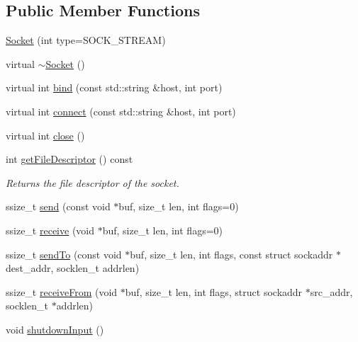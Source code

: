 \subsection*{Public Member Functions}
\begin{DoxyCompactItemize}
\item 
\hyperlink{classSocket_acd3cb39bc957be2f34c91b9e262e1cec}{Socket} (int type=S\-O\-C\-K\-\_\-\-S\-T\-R\-E\-A\-M)
\item 
virtual \hyperlink{classSocket_aeac4eb6379a543d38ed88977d3b6630a}{$\sim$\-Socket} ()
\item 
virtual int \hyperlink{classSocket_acdffcdd08c888132e95da022e0710b1d}{bind} (const std\-::string \&host, int port)
\item 
virtual int \hyperlink{classSocket_a772419bd74c4fe4987d190506a64ff87}{connect} (const std\-::string \&host, int port)
\item 
virtual int \hyperlink{classSocket_aef06605c6725958004116983f1a2051f}{close} ()
\item 
\hypertarget{classSocket_a6b4449d6b454bdb4a3a809976a3c2e41}{int \hyperlink{classSocket_a6b4449d6b454bdb4a3a809976a3c2e41}{get\-File\-Descriptor} () const }\label{classSocket_a6b4449d6b454bdb4a3a809976a3c2e41}

\begin{DoxyCompactList}\small\item\em Returns the file descriptor of the socket. \end{DoxyCompactList}\item 
ssize\-\_\-t \hyperlink{classSocket_a9275eacdb64056a53cf4b9cf54cd2f1a}{send} (const void $\ast$buf, size\-\_\-t len, int flags=0)
\item 
ssize\-\_\-t \hyperlink{classSocket_aa5e98b6f2c4e26fcf90d71c8386fc09d}{receive} (void $\ast$buf, size\-\_\-t len, int flags=0)
\item 
ssize\-\_\-t \hyperlink{classSocket_ac75e3ac80b7e6ae1bdce58c1c4e2b56a}{send\-To} (const void $\ast$buf, size\-\_\-t len, int flags, const struct sockaddr $\ast$dest\-\_\-addr, socklen\-\_\-t addrlen)
\item 
ssize\-\_\-t \hyperlink{classSocket_a7cca10ce2a21e0648850e55a878f51b2}{receive\-From} (void $\ast$buf, size\-\_\-t len, int flags, struct sockaddr $\ast$src\-\_\-addr, socklen\-\_\-t $\ast$addrlen)
\item 
\hypertarget{classSocket_a417b47af24de10184192de00d9112589}{void \hyperlink{classSocket_a417b47af24de10184192de00d9112589}{shutdown\-Input} ()}\label{classSocket_a417b47af24de10184192de00d9112589}


\end{DoxyCompactItemize}
